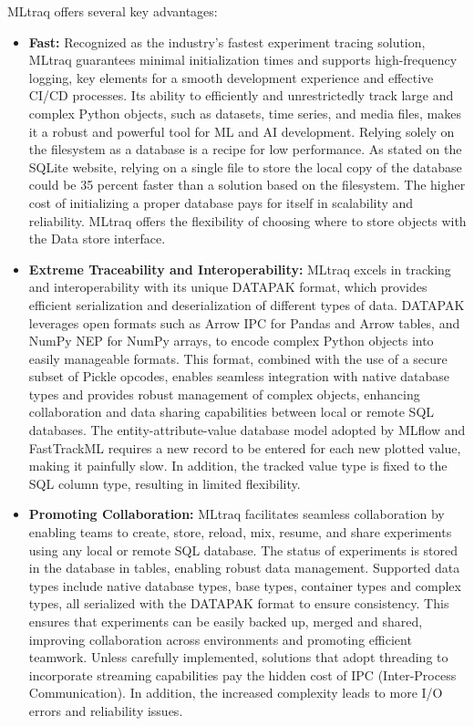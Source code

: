 \begin{itemize}
MLtraq offers several key advantages:

\begin{itemize}
    \item \textbf{Fast:} Recognized as the industry's fastest experiment tracing solution, MLtraq guarantees minimal initialization times and supports high-frequency logging, key elements for a smooth development experience and effective CI/CD processes. Its ability to efficiently and unrestrictedly track large and complex Python objects, such as datasets, time series, and media files, makes it a robust and powerful tool for ML and AI development. Relying solely on the filesystem as a database is a recipe for low performance. As stated on the SQLite website, relying on a single file to store the local copy of the database could be 35 percent faster than a solution based on the \cite{sqlite2024} filesystem. The higher cost of initializing a proper database pays for itself in scalability and reliability. MLtraq offers the flexibility of choosing where to store objects with the Data store interface.
    \item \textbf{Extreme Traceability and Interoperability:} MLtraq excels in tracking and interoperability with its unique DATAPAK format, which provides efficient serialization and deserialization of different types of data. DATAPAK leverages open formats such as Arrow IPC for Pandas and Arrow tables, and NumPy NEP for NumPy arrays, to encode complex Python objects into easily manageable formats. This format, combined with the use of a secure subset of Pickle opcodes, enables seamless integration with native database types and provides robust management of complex objects, enhancing collaboration and data sharing capabilities between local or remote SQL databases. The entity-attribute-value database model adopted by MLflow and FastTrackML requires a new record to be entered for each new plotted value, making it painfully slow. In addition, the tracked value type is fixed to the SQL column type, resulting in limited flexibility.
    \item \textbf{Promoting Collaboration:} MLtraq facilitates seamless collaboration by enabling teams to create, store, reload, mix, resume, and share experiments using any local or remote SQL database. The status of experiments is stored in the database in tables, enabling robust data management. Supported data types include native database types, base types, container types and complex types, all serialized with the DATAPAK format to ensure consistency. This ensures that experiments can be easily backed up, merged and shared, improving collaboration across environments and promoting efficient teamwork. Unless carefully implemented, solutions that adopt threading to incorporate streaming capabilities pay the hidden cost of IPC (Inter-Process Communication). In addition, the increased complexity leads to more I/O errors and reliability issues.

\end{itemize}
\end{itemize}
